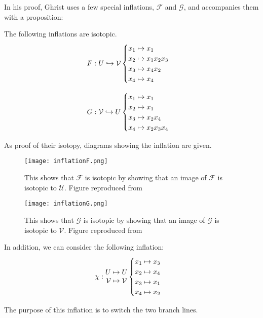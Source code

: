 \documentclass[paper.tex]{subfiles}
\begin{document}
In his proof, Ghrist uses a few special inflations, $\mathcal{F}$ and $\mathcal{G}$, and accompanies them with a proposition:

\begin{prop}
    The following inflations are isotopic.
$$F: U \hookrightarrow \mathcal{V} \begin{cases} x_1 \mapsto x_1 \\ x_2 \mapsto x_1 x_2 x_3 \\ x_3 \mapsto x_4 x_2 \\ x_4 \mapsto x_4 \end{cases}$$

$$G: \mathcal{V} \hookrightarrow U \begin{cases} x_1 \mapsto x_1 \\ x_2 \mapsto x_1 \\ x_3 \mapsto x_2 x_4 \\ x_4 \mapsto x_2 x_3 x_4 \end{cases}$$
\end{prop}

As proof of their isotopy, diagrams showing the inflation are given.


\begin{figure}[h]
  \centering
  \texttt{[image: inflationF.png]}
  \caption{This shows that $\mathcal{F}$ is isotopic by showing that an image of $\mathcal{F}$ is isotopic to $\mathcal{U}$. Figure reproduced from~\cite{ghs1997}}\label{fig:isotopicF}
\end{figure}

\begin{figure}[h]
  \centering
  \texttt{[image: inflationG.png]}
  \caption{This shows that $\mathcal{G}$ is isotopic by showing that an image of $\mathcal{G}$ is isotopic to $\mathcal{V}$.  Figure reproduced from~\cite{ghs1997}}\label{fig:isotopicG}
\end{figure}


In addition, we can consider the following inflation: $$\chi: \begin{matrix} U \mapsto U \\ \mathcal{V} \mapsto \mathcal{V} \end{matrix} \begin{cases} x_1 \mapsto x_3 \\ x_2 \mapsto x_4 \\ x_3 \mapsto x_1 \\ x_4 \mapsto x_2 \end{cases}$$

    The purpose of this inflation is to switch the two branch lines.
\end{document}
